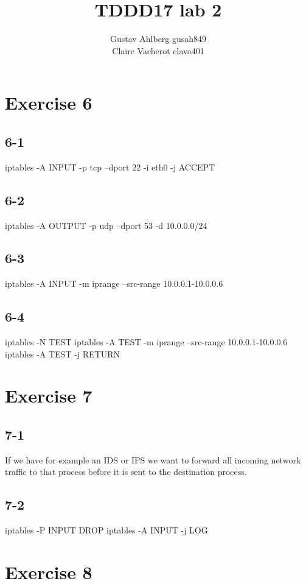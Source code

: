 \documentclass[12pt]{article}
\title{TDDD17 lab 2}
\author{Gustav Ahlberg gusah849 \\ Claire Vacherot clava401}
\begin{document}
\maketitle

\newpage

\section*{Exercise 6}
\subsection*{6-1}
iptables -A INPUT -p tcp --dport 22 -i eth0 -j ACCEPT

\subsection*{6-2}
iptables -A OUTPUT -p udp --dport 53 -d 10.0.0.0/24

\subsection*{6-3}
iptables -A INPUT -m iprange --src-range 10.0.0.1-10.0.0.6

\subsection*{6-4}
iptables -N TEST\newline
iptables -A TEST -m iprange --src-range 10.0.0.1-10.0.0.6\newline
iptables -A TEST -j RETURN\newline


\section*{Exercise 7}
\subsection*{7-1}
If we have for example an IDS or IPS we want to forward all incoming network traffic to that process before it is sent to the destination process.

\subsection*{7-2}
iptables -P INPUT DROP\newline
iptables -A INPUT -j LOG

\section*{Exercise 8}
\end{document}

